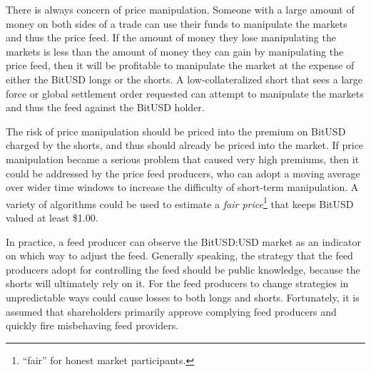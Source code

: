 There is always concern of price manipulation. Someone with a large amount of
money on both sides of a trade can use their funds to manipulate the markets
and thus the price feed. If the amount of money they lose manipulating the
markets is less than the amount of money they can gain by manipulating the
price feed, then it will be profitable to manipulate the market at the expense
of either the BitUSD longs or the shorts. A low-collateralized short that sees
a large force or global settlement order requested can attempt to manipulate
the markets and thus the feed against the BitUSD holder.

The risk of price manipulation should be priced into the premium on BitUSD
charged by the shorts, and thus should already be priced into the market. If
price manipulation became a serious problem that caused very high premiums,
then it could be addressed by the price feed producers, who can adopt a moving
average over wider time windows to increase the difficulty of short-term
manipulation. A variety of algorithms could be used to estimate a \emph{fair
price}\footnote{``fair'' for honest market participants.} that keeps BitUSD
valued at least \$1.00.

In practice, a feed producer can observe the BitUSD:USD market as an indicator
on which way to adjust the feed. Generally speaking, the strategy that the feed
producers adopt for controlling the feed should be public knowledge, because
the shorts will ultimately rely on it. For the feed producers to change
strategies in unpredictable ways could cause losses to both longs and shorts.
Fortunately, it is assumed that shareholders primarily approve complying feed
producers and quickly fire misbehaving feed providers.
